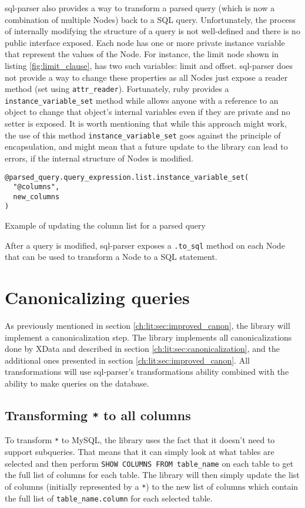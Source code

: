 sql-parser also provides a way to transform a parsed query (which is now a combination of multiple Nodes) back to a SQL query. Unfortunately, the process of internally modifying the structure of a query is not well-defined and there is no public interface exposed. Each node has one or more private instance variable that represent the values of the Node. For instance, the limit node shown in listing \ref{fig:limit_clause}, has two such variables: limit and offset. sql-parser does not provide a way to change these properties as all Nodes just expose a reader method (set using \texttt{attr_reader}). Fortunately, ruby provides a \texttt{instance_variable_set} method while allows anyone with a reference to an object to change that object's internal variables even if they are private and no setter is exposed. It is worth mentioning that while this approach might work, the use of this method \texttt{instance_variable_set} goes against the principle of encapsulation, and might mean that a future update to the library can lead to errors, if the internal structure of Nodes is modified.

\begin{listing}
\begin{verbatim}
@parsed_query.query_expression.list.instance_variable_set(
  "@columns",
  new_columns
)
\end{verbatim}
\caption{Example of updating the column list for a parsed query}
\end{listing}

After a query is modified, sql-parser exposes a \texttt{.to_sql} method on each Node that can be used to transform a Node to a SQL statement.

\section{Canonicalizing queries}

As previously mentioned in section \ref{ch:lit:sec:improved_canon}, the library will implement a canonicalization step. The library implements all canonicalizations done by XData and described in section \ref{ch:lit:sec:canonicalization}, and the additional ones presented in section \ref{ch:lit:sec:improved_canon}. All transformations will use sql-parser's transformations ability combined with the ability to make queries on the database.

\subsection{Transforming \texttt{*} to all columns}
To transform \texttt{*} to MySQL, the library uses the fact that it doesn't need to support subqueries. That means that it can simply look at what tables are selected and then perform \texttt{SHOW COLUMNS FROM table_name} on each table to get the full list of columns for each table. The library will then simply update the list of columns (initially represented by a \texttt{*}) to the new list of columns which contain the full list of \texttt{table\_name.column} for each selected table.

